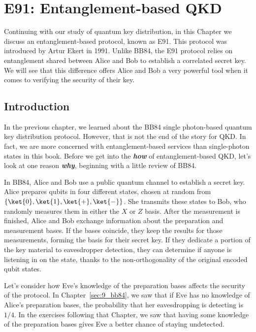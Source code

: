 \chapter{E91: Entanglement-based QKD}
\label{sec:10_E91}

Continuing with our study of quantum key distribution, in this Chapter we discuss an entanglement-based protocol, known as E91.
This protocol was introduced by Artur Ekert in 1991.
Unlike BB84, the E91 protocol relies on entanglement shared between Alice and Bob to establish a correlated secret key.
We will see that this difference offers Alice and Bob a very powerful tool when it comes to verifying the security of their key.



\section{Introduction}
\label{sec:E91-introduction}

In the previous chapter, we learned about the BB84 single photon-based quantum key distribution protocol.
However, that is not the end of the story for QKD.
In fact, we are more concerned with entanglement-based services than single-photon states in this book.
Before we get into the \textbf{\emph{how}} of entanglement-based QKD, let's look at one reason \textbf{\emph{why}}, beginning with a little review of BB84.

In BB84, Alice and Bob use a public quantum channel to establish a secret key.
Alice prepares qubits in four different states, chosen at random from $\{\ket{0}, \ket{1}, \ket{+}, \ket{-}\}$.
She transmits these states to Bob, who randomly measures them in either the $X$ or $Z$ basis.
After the measurement is finished, Alice and Bob exchange information about the preparation and measurement bases.
If the bases coincide, they keep the results for those measurements, forming the basis for their secret key.
If they dedicate a portion of the key material to eavesdropper detection, they can determine if anyone is listening in on the state, thanks to the non-orthogonality of the original encoded qubit states.

Let's consider how Eve's knowledge of the preparation bases affects the security of the protocol.
In Chapter~\ref{sec:9_bb84}, we saw that if Eve has no knowledge of Alice's preparation bases, the probability that her eavesdropping is detecting is $1/4$.
In the exercises following that Chapter, we saw that having some knowledge of the preparation bases gives Eve a better chance of staying undetected.

